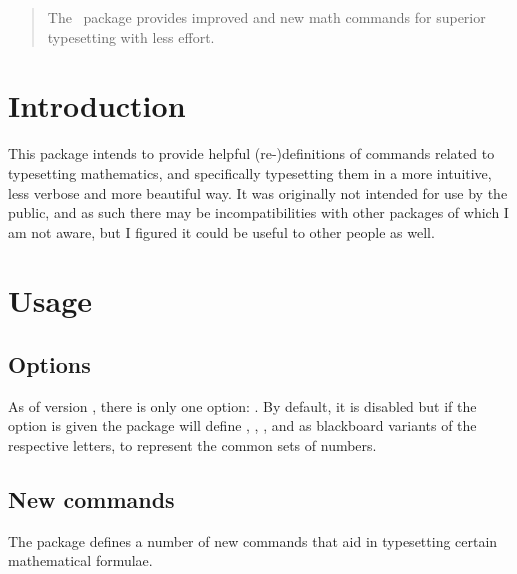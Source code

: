 \documentclass[commonsets,load]{skdoc}
\begin{document}

  \author{Simon Sigurdhsson}

  \maketitle
  \begin{abstract}
    The \thepackage\ package provides improved and new math commands
    for superior typesetting with less effort.
  \end{abstract}

  \section{Introduction}
  This package intends to provide helpful (re-)definitions of commands
  related to typesetting mathematics, and specifically typesetting
  them in a more intuitive, less verbose and more beautiful way.
  It was originally not intended for use by the public, and as such
  there may be incompatibilities with other packages of which I am
  not aware, but I figured it could be useful to other people as well.

  \section{Usage}
  \subsection{Options}
  As of version \theversion, there is only one option: .
  By default, it is disabled but if the option is given the package will
  define , , ,  and  as blackboard 
  variants of the respective letters, to represent the common sets
  of numbers.

  \subsection{New commands}
  The package defines a number of new commands that aid in typesetting
  certain mathematical formulae.
 
\end{document}
